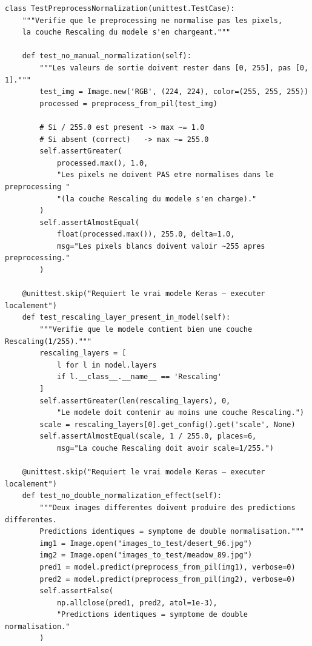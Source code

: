 \documentclass[french, a4paper, 12pt]{article}
\begin{document}
\begin{verbatim}
class TestPreprocessNormalization(unittest.TestCase):
    """Verifie que le preprocessing ne normalise pas les pixels,
    la couche Rescaling du modele s'en chargeant."""

    def test_no_manual_normalization(self):
        """Les valeurs de sortie doivent rester dans [0, 255], pas [0, 1]."""
        test_img = Image.new('RGB', (224, 224), color=(255, 255, 255))
        processed = preprocess_from_pil(test_img)

        # Si / 255.0 est present -> max ~= 1.0
        # Si absent (correct)   -> max ~= 255.0
        self.assertGreater(
            processed.max(), 1.0,
            "Les pixels ne doivent PAS etre normalises dans le preprocessing "
            "(la couche Rescaling du modele s'en charge)."
        )
        self.assertAlmostEqual(
            float(processed.max()), 255.0, delta=1.0,
            msg="Les pixels blancs doivent valoir ~255 apres preprocessing."
        )

    @unittest.skip("Requiert le vrai modele Keras — executer localement")
    def test_rescaling_layer_present_in_model(self):
        """Verifie que le modele contient bien une couche Rescaling(1/255)."""
        rescaling_layers = [
            l for l in model.layers
            if l.__class__.__name__ == 'Rescaling'
        ]
        self.assertGreater(len(rescaling_layers), 0,
            "Le modele doit contenir au moins une couche Rescaling.")
        scale = rescaling_layers[0].get_config().get('scale', None)
        self.assertAlmostEqual(scale, 1 / 255.0, places=6,
            msg="La couche Rescaling doit avoir scale=1/255.")

    @unittest.skip("Requiert le vrai modele Keras — executer localement")
    def test_no_double_normalization_effect(self):
        """Deux images differentes doivent produire des predictions differentes.
        Predictions identiques = symptome de double normalisation."""
        img1 = Image.open("images_to_test/desert_96.jpg")
        img2 = Image.open("images_to_test/meadow_89.jpg")
        pred1 = model.predict(preprocess_from_pil(img1), verbose=0)
        pred2 = model.predict(preprocess_from_pil(img2), verbose=0)
        self.assertFalse(
            np.allclose(pred1, pred2, atol=1e-3),
            "Predictions identiques = symptome de double normalisation."
        )
\end{verbatim}

\end{document}
